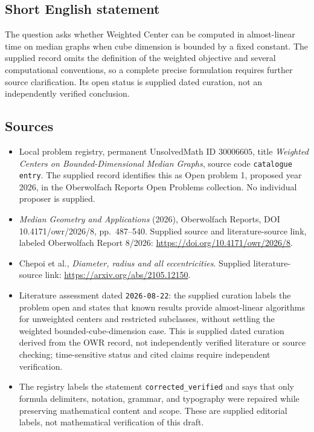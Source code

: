 \documentclass[11pt]{article}
\begin{document}
\subsection{Short English statement}
The question asks whether Weighted Center can be computed in almost-linear time on median graphs when cube dimension is bounded by a fixed constant. The supplied record omits the definition of the weighted objective and several computational conventions, so a complete precise formulation requires further source clarification. Its open status is supplied dated curation, not an independently verified conclusion.
\subsection{Sources}
\begin{itemize}
\item Local problem registry, permanent UnsolvedMath ID \(30006605\), title \emph{Weighted Centers on Bounded-Dimensional Median Graphs}, source code \texttt{catalogue entry}. The supplied record identifies this as Open problem 1, proposed year 2026, in the Oberwolfach Reports Open Problems collection. No individual proposer is supplied.
\item \emph{Median Geometry and Applications} (2026), Oberwolfach Reports, DOI 10.4171/owr/2026/8, pp.~487--540. Supplied source and literature-source link, labeled Oberwolfach Report 8/2026: \url{https://doi.org/10.4171/owr/2026/8}.
\item Chepoi et al., \emph{Diameter, radius and all eccentricities}. Supplied literature-source link: \url{https://arxiv.org/abs/2105.12150}.
\item Literature assessment dated \texttt{2026-08-22}: the supplied curation labels the problem open and states that known results provide almost-linear algorithms for unweighted centers and restricted subclasses, without settling the weighted bounded-cube-dimension case. This is supplied dated curation derived from the OWR record, not independently verified literature or source checking; time-sensitive status and cited claims require independent verification.
\item The registry labels the statement \texttt{corrected\_verified} and says that only formula delimiters, notation, grammar, and typography were repaired while preserving mathematical content and scope. These are supplied editorial labels, not mathematical verification of this draft.
\end{itemize}
\end{document}
